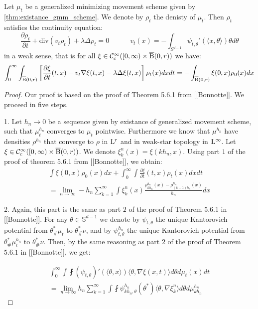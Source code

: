 \begin{thm}
Let $\mu_t$ be a generalized minimizing movement scheme given by \ref{thm:existance_gmm_scheme}. We denote by $\rho_t$ the denisty of $\mu_t$. Then $\rho_t$ satisfies the continuity equation:
\[
\frac{\partial \rho_t}{\partial t} + \text{div}(v_t \rho_t) + \lambda \Delta \rho_t = 0  \quad \quad \quad v_t(x) = - \int_{S^{d-1}} \psi_{t, \theta}'(\langle x , \theta \rangle ) \theta d\theta 
\]
in a weak sense, that is for all $\xi \in \mathcal{C}_c^{\infty} ([0, \infty)\times \operatorname{\overline{B}}(0,r))$ we have:
\[
\int_0^{\infty} \int_{\operatorname{\overline{B}}(0,r)} \left[\frac{\partial \xi}{\partial t}(t,x) - v_t \nabla \xi(t,x)  - \lambda \Delta \xi(t,x)\right] \rho_t(x) dx dt = -\int_{\operatorname{\overline{B}}(0,r)} \xi(0,x)\rho_0(x) dx
\]
\end{thm}
\begin{proof}
Our proof is based on the proof of Theorem 5.6.1 from [[Bonnotte]]. We proceed in five steps.

1. Let $h_n \rightarrow 0$ be a sequence given by existance of generalized movement scheme, such that $\mu_t^{h_n}$ converges to $\mu_t$ pointwise. Furthermore we know that $\mu^{h_n}$ have densities $\rho^{h_n}$ that converge to $\rho$ in $\mathrm{L}^r$ and in weak-star topology in $\mathrm{L}^{\infty}$. Let $\xi \in \mathcal{C}_c^{\infty} ([0, \infty) \times \operatorname{\overline{B}}(0,r))$. We denote $\xi_{k}^n(x)  = \xi(kh_n, x)$. Using part $1$ of the proof of theorem $5.6.1$ from [[Bonnotte]], we obtain:
\begin{multline} \label{thm:cont_proof_part1}
\int \xi(0, x) \rho_0(x) dx + \int_0^{\infty} \int \frac{\partial \xi}{\partial t}(t,x) \rho_t(x) dx dt \\
= \lim_{n \rightarrow \infty} - h_n \sum_{k=1}^{\infty} \int \xi_k^n(x) \frac{\rho_{kh_n}^{h_n}(x) - \rho_{(k-1)h_n}^{h_n}(x) }{h_n} dx
\end{multline}

2. Again, this part is the same as part $2$ of the proof of Theorem 5.6.1 in [[Bonnotte]]. For any $\theta \in \mathbb{S}^{d-1}$ we denote by $\psi_{t, \theta}$ the unique Kantorovich potential from $\theta_{\#}^{*}\mu_t$ to $\theta_{\#}^{*}\nu$, and by $\psi_{t, \theta}^{h_n}$ the unique Kantorovich potential from $\theta_{\#}^{*} \mu_t^{h_n}$ to $\theta_{\#}^{*} \nu$. Then, by the same reasoning as part $2$ of the proof of Theorem $5.6.1$ in [[Bonnotte]], we get:

\begin{multline} \label{thm:cont_proof_part2}
\int_0^{\infty} \int \fint (\psi_{t, \theta})' (\langle \theta, x \rangle ) \langle \theta , \nabla \xi (x, t) \rangle d\theta d\mu_t(x) dt \\
= \lim_{n \rightarrow \infty} h_n \sum_{k=1}^{\infty} \int \fint \psi_{kh_n, \theta}^{h_n} (\theta^{*}) \langle \theta, \nabla \xi_{k}^n \rangle d \theta d\mu_{kh_n}^{h_n}
\end{multline}


\end{proof}
